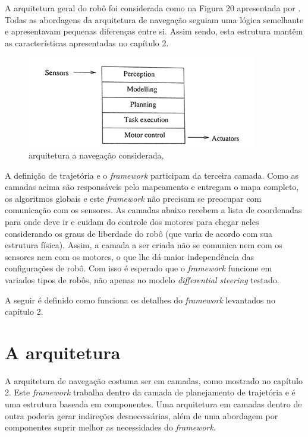 A arquitetura geral do robô foi considerada como na Figura 20 apresentada por \cite{Nehmzow2003}. Todas as abordagens da arquitetura de navegação seguiam uma lógica semelhante e apresentavam pequenas diferenças entre si. Assim sendo, esta estrutura mantêm as características apresentadas no capítulo 2.

\begin{figure}[h]
	\centering
	\label{fig20}
		\includegraphics[keepaspectratio=true,scale=1]{figuras/arqusada.jpg}
	\caption{arquitetura a navegação considerada, \cite{Nehmzow2003}}
\end{figure}

A definição de trajetória e o \textit{framework} participam da terceira camada. Como as camadas acima são responsáveis pelo mapeamento e entregam o mapa completo, os algoritmos globais e este \textit{framework} não precisam se preocupar com comunicação com os sensores. As camadas abaixo recebem a lista de coordenadas para onde deve ir e cuidam do controle dos motores para chegar neles considerando os graus de liberdade do robô (que varia de acordo com sua estrutura física). Assim, a camada a ser criada não se comunica nem com os sensores nem com os motores, o que lhe dá maior independência das configurações de robô. Com isso é esperado que o \textit{framework} funcione em variados tipos de robôs, não apenas no modelo \textit{differential steering} testado.

A seguir é definido como funciona os detalhes do \textit{framework} levantados no capítulo 2.

\section{A arquitetura}

A arquitetura de navegação costuma ser em camadas, como mostrado no capítulo 2. Este \textit{framework} trabalha dentro da camada de planejamento de trajetória e é uma estrutura baseada em componentes. Uma arquitetura em camadas dentro de outra poderia gerar indireções desnecessárias, além de uma abordagem por componentes suprir melhor as necessidades do \textit{framework}.


